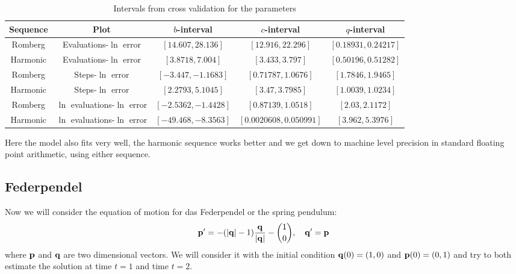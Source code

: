 \begin{table}[H]
    \centering
    \begin{tabular}{c|c||c|c|c}
Sequence & Plot & \(b\)-interval & \(c\)-interval & \(q\)-interval\\\hline
Romberg & Evaluations-\(\ln\) error &\([14.607, 28.136]\) & \([12.916, 22.296]\) & \([0.18931, 0.24217]\)\\
Harmonic & Evaluations-\(\ln\) error  & \([3.8718, 7.004]\) & \([3.433, 3.797]\) & \([0.50196, 0.51282]\)\\
Romberg & Steps-\(\ln\) error & \([-3.447, -1.1683]\) & \([0.71787, 1.0676]\) & \([1.7846, 1.9465]\)\\
Harmonic & Steps-\(\ln\) error  & \([2.2793, 5.1045]\) & \([3.47, 3.7985]\) & \([1.0039, 1.0234]\)\\
Romberg & \(\ln\) evaluations-\(\ln\) error & \([-2.5362, -1.4428]\) & \([0.87139, 1.0518]\) & \([2.03, 2.1172]\)\\
Harmonic & \(\ln\) evaluations-\(\ln\) error & \([-49.468, -8.3563]\) & \([0.0020608, 0.050991]\) & \([3.962, 5.3976]\)\\
    \end{tabular}
    \caption{Intervals from cross validation for the parameters}
    \label{tab:my_label}
\end{table}

Here the model also fits very well, the harmonic sequence works better and we get down to machine level precision in standard floating point arithmetic, using either sequence.

\subsection{Federpendel}

Now we will consider the equation of motion for das Federpendel or the spring pendulum:
\[
\mathbf{p}' = -(|\mathbf{q}| - 1)\frac{\mathbf{q}}{|\mathbf{q}|} - {1\choose 0}, \quad \mathbf{q}' = \mathbf{p}
\]
where \(\mathbf{p}\) and \(\mathbf{q}\) are two dimensional vectors. We will consider it with the initial condition \(\mathbf{q}(0) = (1,0)\) and \(\mathbf{p}(0) = (0,1)\) and try to both estimate the solution at time \(t = 1\) and time \(t = 2\).

